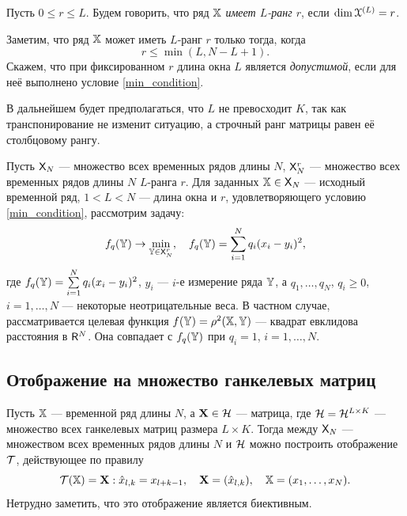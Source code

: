 \documentclass[12pt,a4paper,fleqn,leqno]{article}
\begin{document}
\begin{definition}
Пусть $0 \le r \le L$. Будем говорить, что ряд $\mathbb{X}$ \emph{имеет $L$-ранг $r$}, если $\dim \EuScript{X}^{(L)} = r$.
\end{definition}

Заметим, что ряд $\mathbb{X}$ может иметь $L$-ранг $r$ только тогда, когда
\begin{equation}
r \le \min(L, N-L+1). \label{min_condition}
\end{equation}
Скажем, что при фиксированном $r$ длина окна $L$ является \emph{допустимой}, если для неё выполнено условие \eqref{min_condition}.

В дальнейшем будет предполагаться, что $L$ не превосходит $K$, так как транспонирование не изменит ситуацию, а строчный ранг матрицы равен её столбцовому рангу.

Пусть $\mathsf{X}_N$ --- множество всех временных рядов длины $N$, $\mathsf{X}_N^r$ --- множество всех временных рядов длины $N$ $L$-ранга $r$. Для заданных $\mathbb{X} \in \mathsf{X}_N$ --- исходный временной ряд, $1 < L < N$ --- длина окна и $r$, удовлетворяющего условию \eqref{min_condition}, рассмотрим задачу:
\begin{equation} \label{L-rank_task}
f_q(\mathbb{Y}) \to \min_{\mathbb{Y} \in \mathsf{X}_N^r}, \quad f_q(\mathbb{Y}) = \sum \limits_{i=1}^N q_i(x_i - y_i)^2,
\end{equation}
где $f_q(\mathbb{Y}) = \sum \limits_{i=1}^N q_i(x_i - y_i)^2$, $y_i$ --- $i$-е измерение ряда $\mathbb{Y}$, а $q_1, \ldots, q_N$, $q_i \ge 0$, $i = 1, \ldots, N$ --- некоторые неотрицательные веса. В частном случае, рассматривается целевая функция $f(\mathbb{Y}) = \rho^2(\mathbb{X}, \mathbb{Y})$ --- квадрат евклидова расстояния в $\mathsf{R}^N$. Она совпадает с $f_q(\mathbb{Y})$ при $q_i = 1$, $i = 1, \ldots, N$.

\subsection{Отображение на множество ганкелевых матриц}
Пусть $\mathbb{X}$ --- временной ряд длины $N$, а $\mathbf{X} \in \mathcal{H}$ --- матрица, где $\mathcal{H} = \mathcal{H}^{L \times K}$ --- множество всех ганкелевых матриц размера $L \times K$. Тогда между $\mathsf{X}_N$ --- множеством всех временных рядов длины $N$ и $\mathcal{H}$ можно построить отображение $\mathcal{T}$, действующее по правилу
\begin{equation*}
\mathcal{T}(\mathbb{X}) = \mathbf{X}: \hat x_{l, k} = x_{l + k - 1}, \quad \mathbf{X} = (\hat x_{l,k}), \quad \mathbb{X} = (x_1, \ldots, x_N).
\end{equation*}
Нетрудно заметить, что это отображение является биективным.
\end{document}
